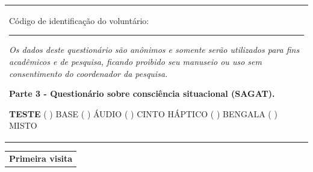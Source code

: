 %
%
%
%
%

\begin{table}[!htb]
    \centering
    \begin{tabular}{m{1\linewidth}}

        {\color{gray}
        
        Código de identificação do voluntário: \rule{1in}{.2mm}
        
        \textit{Os dados deste questionário são anônimos e somente serão utilizados para fins acadêmicos e de pesquisa, ficando proibido seu manuseio ou uso sem consentimento do coordenador da pesquisa.}
        }
        
        \begin{center}
        \textbf{Parte 3 - Questionário sobre consciência situacional (SAGAT).}
        \end{center}
        
        \noindent
        \textbf{TESTE} ( ) BASE \hfill ( ) ÁUDIO \hfill ( ) CINTO HÁPTICO \hfill ( ) BENGALA \hfill ( ) MISTO
        
    \end{tabular}

    \centering
    \begin{tabular}{m{1\linewidth}}
        \textbf{Primeira visita}
    \end{tabular}

\hspace{0.5cm}

%


\end{table}
